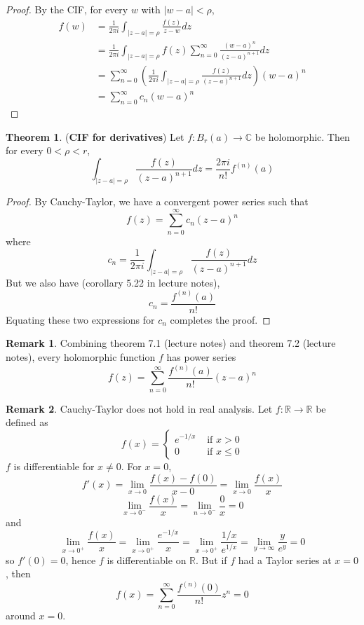 \documentclass[12pt,a4paper]{article}
\theoremstyle{definition}
\newtheorem{theorem}[definition]{Theorem}
\newtheorem*{remark}{Remark}
\begin{document}
\begin{proof}
	By the CIF, for every $w$ with $|w - a| < \rho$,
	\[
		\begin{aligned}
			f(w)
				& = \frac{1}{2 \pi i} \int_{|z - a| = \rho} \frac{f(z)}{z - w} dz \\
				& = \frac{1}{2 \pi i} \int_{|z - a| = \rho} f(z) \sum_{n = 0}^{\infty} \frac{{(w - a)}^n}{{(z - a)}^{n + 1}} dz \\
				& = \sum_{n = 0}^{\infty} \left( \frac{1}{2 \pi i} \int_{|z - a| = \rho} \frac{f(z)}{{(z - a)}^{n + 1}} dz \right) {(w - a)}^n \\
				& = \sum_{n = 0}^{\infty} c_n {(w - a)}^n
		\end{aligned}
	\]
\end{proof}

\begin{theorem}
	(\textbf{CIF for derivatives}) Let $f: B_r(a) \rightarrow \mathbb{C}$ be holomorphic. Then for every $0 < \rho < r$,
	\[
		\int_{|z - a| = \rho} \frac{f(z)}{{(z - a)}^{n + 1}} dz = \frac{2 \pi i}{n!} f^{(n)} (a)
	\]
\end{theorem}

\begin{proof}
	By Cauchy-Taylor, we have a convergent power series such that
	\[
		f(z) = \sum_{n = 0}^{\infty} c_n {(z - a)}^n
	\]
	where
	\[
		c_n = \frac{1}{2 \pi i} \int_{|z - a| = \rho} \frac{f(z)}{{(z - a)}^{n + 1}} dz
	\]
	But we also have (corollary 5.22 in lecture notes),
	\[
		c_n = \frac{f^{(n)} (a)}{n!}
	\]
	Equating these two expressions for $c_n$ completes the proof.
\end{proof}

\begin{remark}
	Combining theorem 7.1 (lecture notes) and theorem 7.2 (lecture notes), every holomorphic function $f$ has power series
	\[
		f(z) = \sum_{n = 0}^{\infty} \frac{f^{(n)} (a)}{n!} {(z - a)}^n
	\]
\end{remark}

\begin{remark}
	Cauchy-Taylor does not hold in real analysis. Let $f: \mathbb{R} \rightarrow \mathbb{R}$ be defined as
	\[
		f(x) = \begin{cases}
			e^{-1 / x} & \text{ if } x > 0 \\
			0 & \text{ if } x \le 0
		\end{cases}
	\]
	$f$ is differentiable for $x \ne 0$. For $x = 0$,
	\[
		f'(x) = \lim_{x \rightarrow 0} \frac{f(x) - f(0)}{x - 0} = \lim_{x \rightarrow 0} \frac{f(x)}{x}
	\]
	\[
		\lim_{x \rightarrow 0^-} \frac{f(x)}{x} = \lim_{n \rightarrow 0^-} \frac{0}{x} = 0
	\]
	and
	\[
		\lim_{x \rightarrow 0^+} \frac{f(x)}{x} = \lim_{x \rightarrow 0^+} \frac{e^{-1 / x}}{x} = \lim_{x \rightarrow 0^+} \frac{1 / x}{e^{1 / x}} = \lim_{y \rightarrow \infty} \frac{y}{e^y} = 0
	\]
	so $f'(0) = 0$, hence $f$ is differentiable on $\mathbb{R}$. But if $f$ had a Taylor series at $x = 0$, then
	\[
		f(x) = \sum_{n = 0}^{\infty} \frac{f^{(n)} (0)}{n!} z^n = 0
	\]
	around $x = 0$.
\end{remark}
\end{document}
